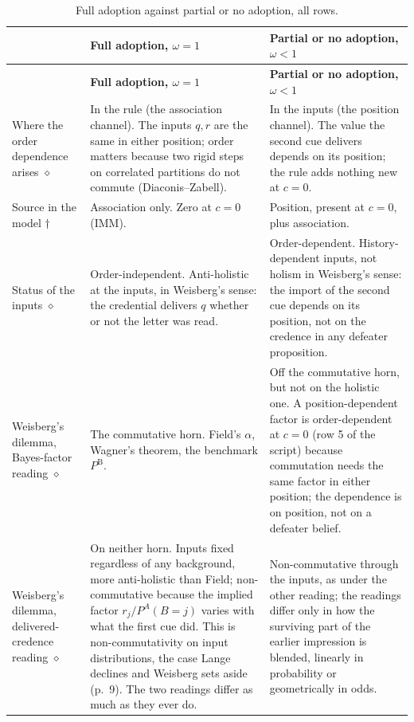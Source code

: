 \documentclass[11pt,a4paper]{article}
\newcommand{\PB}{P^{\mathrm{B}}}
\begin{document}
\small
\begin{longtable}{@{}L{3.1cm}L{6.4cm}L{6.4cm}@{}}
\caption{Full adoption against partial or no adoption, all rows.}\label{tab:full}\\
\toprule
& \textbf{Full adoption, $\omega=1$} & \textbf{Partial or no adoption, $\omega<1$} \\
\midrule
\endfirsthead
\toprule
& \textbf{Full adoption, $\omega=1$} & \textbf{Partial or no adoption, $\omega<1$} \\
\midrule
\endhead
Where the order dependence arises $\diamond$ &
In the rule (the association channel). The inputs $q,r$ are the same in either position; order matters
because two rigid steps on correlated partitions do not commute
(Diaconis--Zabell). &
In the inputs (the position channel). The value the second cue delivers
depends on its position; the rule adds nothing new at $c=0$. \\
\addlinespace[3pt]
Source in the model $\dagger$ &
Association only. Zero at $c=0$ (IMM). &
Position, present at $c=0$, plus association. \\
\addlinespace[3pt]
Status of the inputs $\diamond$ &
Order-independent. Anti-holistic at the inputs, in Weisberg's sense: the
credential delivers $q$ whether or not the letter was read. &
Order-dependent. History-dependent inputs, not holism in Weisberg's sense:
the import of the second cue depends on its position, not on the credence in
any defeater proposition. \\
\addlinespace[3pt]
Weisberg's dilemma, Bayes-factor reading $\diamond$ &
The commutative horn. Field's $\alpha$, Wagner's theorem, the benchmark
$\PB$. &
Off the commutative horn, but not on the holistic one. A position-dependent
factor is order-dependent at $c=0$ (row 5 of the script) because commutation
needs the same factor in either position; the dependence is on position, not
on a defeater belief. \\
\addlinespace[3pt]
Weisberg's dilemma, delivered-credence reading $\diamond$ &
On neither horn. Inputs fixed regardless of any background, more
anti-holistic than Field; non-commutative because the implied factor
$r_j/P^{A}(B{=}j)$ varies with what the first cue did. This is
non-commutativity on input distributions, the case Lange declines and
Weisberg sets aside (p.~9). The two readings differ as much as they ever
do. &
Non-commutative through the inputs, as under the other reading; the readings
differ only in how the surviving part of the earlier impression is blended,
linearly in probability or geometrically in odds. \\

\end{longtable}
\end{document}
